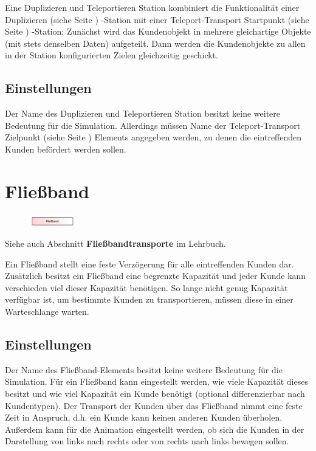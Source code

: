 Eine Duplizieren und Teleportieren Station kombiniert die Funktionalität
einer Duplizieren (siehe Seite \pageref{ref:ModelElementDuplicate}) -Station mit einer
Teleport-Transport Startpunkt (siehe Seite \pageref{ref:ModelElementTeleportSource}) -Station:
Zunächst wird das Kundenobjekt in mehrere gleichartige Objekte (mit stets denselben Daten)
aufgeteilt. Dann werden die Kundenobjekte zu allen in der Station konfigurierten Zielen
gleichzeitig geschickt.

\subsection*{Einstellungen}

Der Name des Duplizieren und Teleportieren Station besitzt keine weitere Bedeutung
für die Simulation. Allerdings müssen Name der
Teleport-Transport Zielpunkt (siehe Seite \pageref{ref:ModelElementTeleportDestination}) 
Elements angegeben werden, zu denen die eintreffenden Kunden befördert werden sollen.


\section{Fließband}
\label{ref:ModelElementConveyor}

\begin{figure}
\vspace{-22pt}
\includegraphics[width=2cm]{imageModelElementConveyor.png}
\vspace{-22pt}
\end{figure}

Siehe auch Abschnitt \textbf{Fließbandtransporte} im Lehrbuch.

Ein Fließband stellt eine feste Verzögerung für alle eintreffenden Kunden dar.
Zusätzlich besitzt ein Fließband eine begrenzte Kapazität und jeder Kunde
kann verschieden viel dieser Kapazität benötigen. So lange nicht genug
Kapazität verfügbar ist, um bestimmte Kunden zu transportieren, müssen diese
in einer Warteschlange warten.

\subsection*{Einstellungen}

Der Name des Fließband-Elements besitzt keine weitere Bedeutung
für die Simulation. Für ein Fließband kann eingestellt werden,
wie viele Kapazität dieses besitzt und wie viel Kapazität ein
Kunde benötigt (optional differenzierbar nach Kundentypen). Der
Transport der Kunden über das Fließband nimmt eine feste Zeit in
Anspruch, d.h. ein Kunde kann keinen anderen Kunden überholen.
Außerdem kann für die Animation eingestellt werden, ob sich die
Kunden in der Darstellung von links nach rechts oder von rechts
nach links bewegen sollen.


